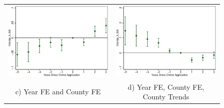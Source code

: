 \documentclass[11pt,letterpaper]{article}
\begin{document}
\begin{figure}
\begin{tabular}{cc}
\includegraphics[scale=0.57]{tabfig/evstu_snap_h_tot_total_pop_yrcf_5_3}&\includegraphics[scale=0.57]{tabfig/evstu_snap_h_tot_total_pop_yrcfsttr_5_3}\\
c) Year FE and County FE&d) Year FE, County FE, County Trends\\
\end{tabular}
\end{figure}
\end{document}
